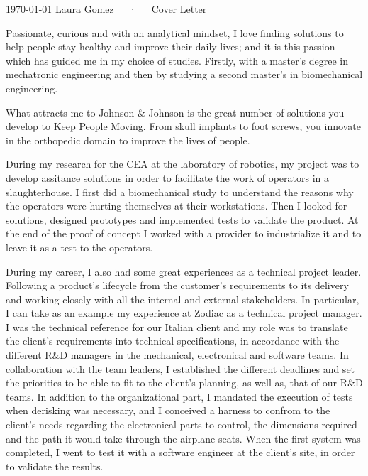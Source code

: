 \documentclass[11pt, a4paper]{awesome-cv}
\begin{document}
\makecvheader[R]

\makecvfooter
  {\today}
  {Laura Gomez~~~·~~~Cover Letter}
  {}

\makelettertitle

\begin{cvletter}


Passionate, curious and with an analytical mindset, I love finding solutions to help people stay healthy and improve their daily lives;
and it is this passion which has guided me in my choice of studies. Firstly, with a master's degree in mechatronic engineering and then by studying a second master's in biomechanical engineering. 

What attracts me to Johnson \& Johnson is the great number of solutions you develop to Keep People Moving. From skull implants to foot screws, you innovate in the orthopedic domain to improve the lives of people.

During my research for the CEA at the laboratory of robotics, my project was to develop assitance solutions in order to facilitate the work of operators in a slaughterhouse. 
I first did a biomechanical study to understand the reasons why the operators were hurting themselves at their workstations. Then I looked for solutions, designed prototypes and implemented tests to validate the product.
At the end of the proof of concept I worked with a provider to industrialize it and to leave it as a test to the operators.

During my career, I also had some great experiences as a technical project leader. 
Following a product's lifecycle from the customer's requirements to its delivery and working closely with all the internal and external stakeholders.
In particular, I can take as an example my experience at Zodiac as a technical project manager. 
I was the technical reference for our Italian client and my role was to translate the client's requirements into technical specifications, in accordance with the different R\&D managers in the mechanical, electronical and software teams.
In collaboration with the team leaders, I established the different deadlines and set the priorities to be able to fit to the client's planning, as well as, that of our R\&D teams.
In addition to the organizational part, I mandated the execution of tests when derisking was necessary, and I conceived a harness to confrom to the client's needs regarding the electronical parts to control, the dimensions required and the path it would take through the airplane seats.
When the first system was completed, I went to test it with a software engineer at the client's site, in order to validate the results.


\end{cvletter}
\end{document}
